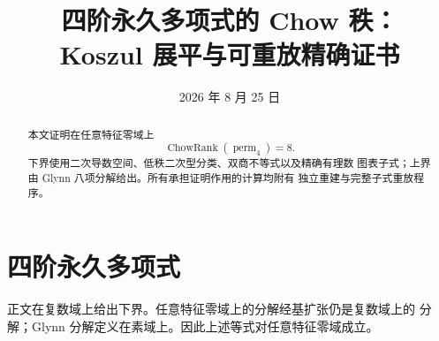 \documentclass[10pt,a4paper,reqno]{amsart}
\title{四阶永久多项式的 Chow 秩：\\Koszul 展平与可重放精确证书}
\author{}
\date{2026 年 8 月 25 日}
\theoremstyle{definition}
\newcommand{\ChowRank}{\operatorname{ChowRank}}
\newcommand{\perm}{\operatorname{perm}}
\begin{document}
\begin{abstract}
本文证明在任意特征零域上
\[
  \ChowRank(\perm_4)=8.
\]
下界使用二次导数空间、低秩二次型分类、双商不等式以及精确有理数
图表子式；上界由 Glynn 八项分解给出。所有承担证明作用的计算均附有
独立重建与完整子式重放程序。
\end{abstract}
\maketitle

\section{四阶永久多项式}


正文在复数域上给出下界。任意特征零域上的分解经基扩张仍是复数域上的
分解；Glynn 分解定义在素域上。因此上述等式对任意特征零域成立。
\end{document}
